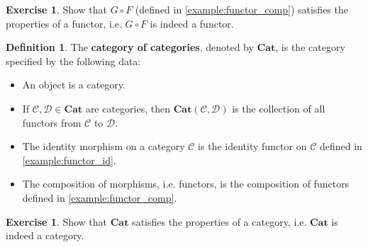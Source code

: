 \documentclass[a4paper,11pt, oneside,titlepage=false]{scrbook}
\theoremstyle{plain}
\theoremstyle{definition}
\newtheorem{dfn}[thm]{Definition}
\newtheorem{exer}[thm]{Exercise}
\newcommand{\Cat}[1]{\mathcal{#1}}
\newcommand{\CC}{\Cat{C}}
\newcommand{\DD}{\Cat{D}}
\newcommand{\Catb}[1]{\mathbf{#1}}
\newcommand{\CAT}{\Catb{Cat}}
\newcommand{\CHom}[3]{{#1}(#2,#3)}
\newcommand{\co}[2]{\ensuremath{#2 \circ #1}}
\begin{document}
\begin{exer} Show that $\co{F}{G}$ (defined in \cref{example:functor_comp}) satisfies the properties of a functor, i.e. $\co{F}{G}$ is indeed a functor.
\end{exer}

\begin{dfn} The \textbf{category of categories}, denoted by $\CAT$, is the category specified by the following data:
\begin{itemize}
\item An object is a category.
\item If $\CC, \DD\in\CAT$ are categories, then $\CHom \CAT \CC \DD$ is the collection of all functors from $\CC$ to $\DD$.
\item The identity morphism on a category $\CC$ is the identity functor on $\CC$ defined in \cref{example:functor_id}.
\item The composition of morphisms, i.e. functors, is the composition of functors defined in \cref{example:functor_comp}.
\end{itemize}
\end{dfn}

\begin{exer} Show that $\CAT$ satisfies the properties of a category, i.e. $\CAT$ is indeed a category.
\end{exer}
\end{document}
